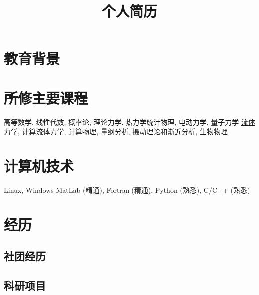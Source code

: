 \documentclass[11pt,a4paper,sans]{moderncv}        %
\title{个人简历}                               %
\begin{document}
\makecvtitle

\vspace{-3em}
\section{教育背景}

\section{所修主要课程}
 {高等数学, 线性代数, 概率论, 理论力学, 热力学统计物理, 电动力学, 量子力学}{}{}{}{}{}
 {
\href{http://wenku.baidu.com/view/5c87b3ad7c1cfad6195fa7cf.html}{流体力学}, 
\href{http://wenku.baidu.com/view/2cf3a1ac9e314332396893d8.html}{计算流体力学}, 
\href{http://wenku.baidu.com/view/2dc9679d89eb172dec63b73b.html}{计算物理}, 
\href{http://wenku.baidu.com/view/e16f817d0722192e4536f6d6.html}{量纲分析}, 
\href{http://wenku.baidu.com/view/0651c76bb90d6c85ec3ac69e.html}{摄动理论和渐近分析},
\href{}{生物物理}
}{}{}{}{}{}

\section{计算机技术}
 {Linux, Windows}{}{}{}{}{}
 {MatLab (精通), Fortran (精通), Python (熟悉), C/C++ (熟悉)}{}{}{}{}{}
\section{经历}
\subsection{社团经历}

\subsection{科研项目}
\end{document}
